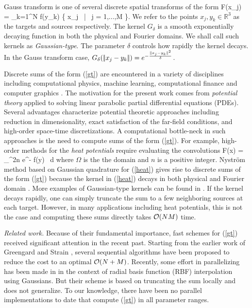 Gauss transform is one of several discrete spatial transforms of the form 
%
\beq F(x_j) = \sum_{k=1}^N  f(y_k) \quad {} \quad \{ x_j \, | \, j = 1,...,M \}.  \label{gt} \eeq
%
We refer to the points $ x_j, y_k \in \mathbb{R}^3 $ as the targets and sources respectively. The kernel $G_\delta$ is a smooth exponentially decaying function in both the physical and Fourier domains. We shall call such kernels as {\em Gaussian-type}. The parameter $\delta$ controls how rapidly the kernel decays.  In the Gauss transform case, $G_\delta (|\!| x_j - y_k |\!|) = e^{-\frac{|\!| x_j - y_k |\!|^2}{\delta}}$. 

Discrete sums of the form (\ref{gt}) are encountered in a variety of disciplines including computational physics,
 machine learning, computational finance and computer graphics \cite{strain94adap, elgammal03, broadie03, kim05, veerapaneni08}. The motivation for the present work comes from {\em potential theory} \cite{kress99} applied to solving linear parabolic partial differential equations (PDEs). Several advantages characterize potential theoretic approaches including reduction in dimensionality, exact satisfaction of the far-field conditions, and high-order space-time discretizations. A computational bottle-neck in such approaches is the need to compute sums of the form (\ref{gt}). For example, high-order methods for the {\em heat potentials} require evaluating the convolutions \cite{li09, skv09}
% 
\beq F(x) = \int_\Omega {}^{2n} e^{-} f(y) \, d\Omega \label{heat} \eeq
% 
where $\Omega$ is the the domain and $n$ is a positive integer. Nystr\"{o}m method based on Gaussian quadrature for (\ref{heat}) gives rise to discrete sums of the form (\ref{gt}) because the kernel in (\ref{heat}) decays in both physical and Fourier domain \cite{fggt}. More examples of Gaussian-type kernels can be found in \cite{victor03}. If the kernel decays rapidly, one can simply truncate the sum to a few neighboring sources at each target. However, in many applications including heat potentials, this is not the case and computing these sums directly takes $\mathcal{O}(NM)$ time. 

{\em Related work.} Because of their fundamental importance, fast schemes for (\ref{gt}) received significant attention in the recent past. Starting from the earlier work of Greengard and Strain \cite{fgt}, several sequential algorithms \cite{greengard98, sun02, duraiswami03, tausch09, fggt} have been proposed to reduce the cost to an optimal $\mathcal{O}(N+M)$. Recently, some effort in parallelizing has been made in \cite{rio09} in the context of radial basis function (RBF) interpolation using Gaussians. But their scheme is based on truncating the sum locally and does not generalize. To our knowledge, there have been no parallel implementations to date that compute (\ref{gt}) in all parameter ranges. 

